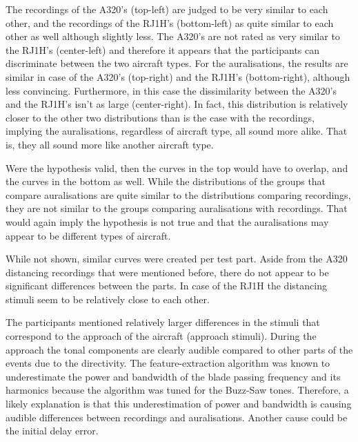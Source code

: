\documentclass[10pt,twocolumn]{article}
\begin{document}
The recordings of the A320's (top-left) are judged to be very similar to each other, and
the recordings of the RJ1H's (bottom-left) as quite similar to each other as well although
slightly less. The A320's are not rated as very similar to the RJ1H's (center-left) and
therefore it appears that the participants can discriminate between the two
aircraft types.
For the auralisations, the results are similar in case of the A320's (top-right)
and the RJ1H's (bottom-right), although less convincing. Furthermore, in this case the
dissimilarity between the A320's and the RJ1H's isn't as large (center-right). In fact, this
distribution is relatively closer to the other two distributions than is the
case with the recordings, implying the auralisations, regardless of aircraft
type, all sound more alike. That is, they all sound more like another aircraft type.

Were the hypothesis valid, then the curves in the top would have to overlap, and
the curves in the bottom as well. While the distributions of the groups that
compare auralisations are quite similar to the distributions comparing
recordings, they are not similar to the groups comparing auralisations with
recordings. That would again imply the hypothesis is not true and that the
auralisations may appear to be different types of aircraft.


While not shown, similar curves were created per test part.
Aside from the A320 distancing recordings that were mentioned before,
there do not appear to be significant differences between the parts.
In case of the RJ1H the distancing stimuli seem to be relatively close to each other.

The participants mentioned relatively larger differences in the stimuli that
correspond to the approach of the aircraft (approach stimuli). During the
approach the tonal components are clearly audible compared to other parts of the
events due to the directivity. The feature-extraction algorithm was known to
underestimate the power and bandwidth of the blade passing frequency and its
harmonics because the algorithm was tuned for the Buzz-Saw tones. Therefore, a
likely explanation is that this underestimation of power and bandwidth is
causing audible differences between recordings and auralisations.
Another cause could be the initial delay error.
\end{document}

